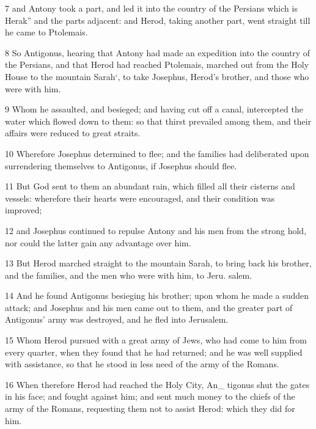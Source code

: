 \par 7 and Antony took a part, and led it into the country of the Persians which is Herak” and the parts adjacent: and Herod, taking another part, went straight till he came to Ptolemais. 

\par 8 So Antigonus, hearing that Antony had made an expedition into the country of the Persians, and that Herod had reached Ptolemais, marched out from the Holy House to the mountain Sarah‘, to take Josephus, Herod’s brother, and those who were with him. 

\par 9 Whom he assaulted, and besieged; and having cut off a canal, intercepted the water which flowed down to them: so that thirst prevailed among them, and their affairs were reduced to great straits. 

\par 10 Wherefore Josephus determined to flee; and the families had deliberated upon surrendering themselves to Antigonus, if Josephus should flee. 

\par 11 But God sent to them an abundant rain, which filled all their cisterns and vessels: wherefore their hearts were encouraged, and their condition was improved; 

\par 12 and Josephus continued to repulse Antony and his men from the strong hold, nor could the latter gain any advantage over him. 

\par 13 But Herod marched straight to the mountain Sarah, to bring back his brother, and the families, and the men who were with him, to Jeru. salem. 

\par 14 And he found Antigonus besieging his brother; upon whom he made a sudden attack; and Josephus and his men came out to them, and the greater part of Antigonus’ army was destroyed, and he fled into Jerusalem. 

\par 15 Whom Herod pursued with a great army of Jews, who had come to him from every quarter, when they found that he had returned; and he was well supplied with assistance, so that he stood in less need of the army of the Romans. 

\par 16 When therefore Herod had reached the Holy City, An_ tigonus shut the gates in his face; and fought against him; and sent much money to the chiefs of the army of the Romans, requesting them not to assist Herod: which they did for him. 

